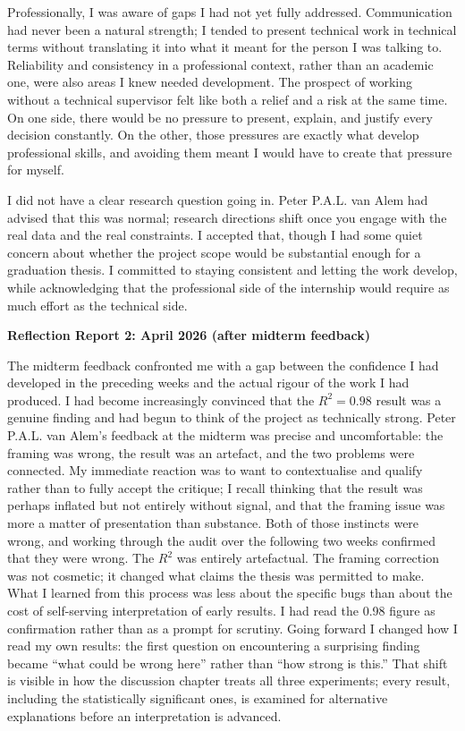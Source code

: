 \documentclass[11pt,a4paper]{report}
\begin{document}
Professionally, I was aware of gaps I had not yet fully addressed. Communication had never been a
natural strength; I tended to present technical work in technical terms without translating it into
what it meant for the person I was talking to. Reliability and consistency in a professional
context, rather than an academic one, were also areas I knew needed development. The prospect of
working without a technical supervisor felt like both a relief and a risk at the same time. On one
side, there would be no pressure to present, explain, and justify every decision constantly. On the
other, those pressures are exactly what develop professional skills, and avoiding them meant I
would have to create that pressure for myself.

I did not have a clear research question going in. Peter P.A.L. van Alem had advised that this was normal;
research directions shift once you engage with the real data and the real constraints. I accepted
that, though I had some quiet concern about whether the project scope would be substantial enough
for a graduation thesis. I committed to staying consistent and letting the work develop, while
acknowledging that the professional side of the internship would require as much effort as the
technical side.

\textbf{Reflection Report 2: April 2026 (after midterm feedback)}

The midterm feedback confronted me with a gap between the confidence I had developed in the
preceding weeks and the actual rigour of the work I had produced. I had become increasingly
convinced that the $R^2 = 0.98$ result was a genuine finding and had begun to think of the project
as technically strong. Peter P.A.L. van Alem's feedback at the midterm was precise and uncomfortable: the
framing was wrong, the result was an artefact, and the two problems were connected. My immediate
reaction was to want to contextualise and qualify rather than to fully accept the critique; I
recall thinking that the result was perhaps inflated but not entirely without signal, and that the
framing issue was more a matter of presentation than substance. Both of those instincts were wrong,
and working through the audit over the following two weeks confirmed that they were wrong. The
$R^2$ was entirely artefactual. The framing correction was not cosmetic; it changed what claims the
thesis was permitted to make. What I learned from this process was less about the specific bugs
than about the cost of self-serving interpretation of early results. I had read the 0.98 figure as
confirmation rather than as a prompt for scrutiny. Going forward I changed how I read my own
results: the first question on encountering a surprising finding became ``what could be wrong here''
rather than ``how strong is this.'' That shift is visible in how the discussion chapter treats all
three experiments; every result, including the statistically significant ones, is examined for
alternative explanations before an interpretation is advanced.
\end{document}
